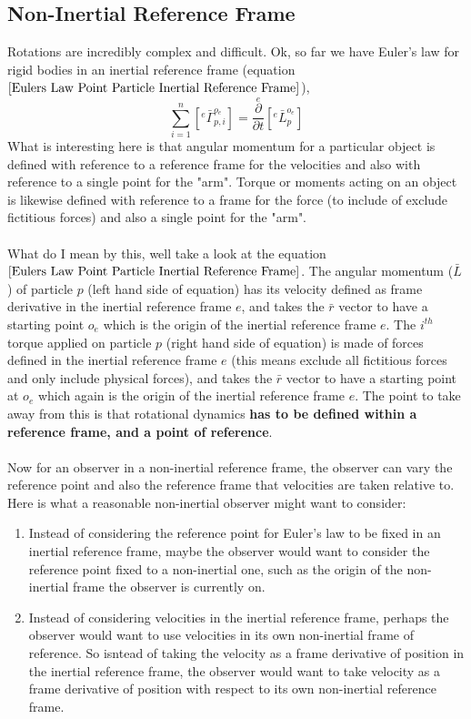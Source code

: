 \subsection{Non-Inertial Reference Frame}
\label{Eulers law point particle non-inertial reference frame}
\begin{comment}
\end{comment}
Rotations are incredibly complex and difficult.
Ok, so far we have Euler's law for rigid bodies in an inertial reference frame (equation $\ref{Eulers Law Point Particle Inertial Reference Frame}$),
$$\sum^{n}_{i = 1}\left[{}^{e}\bar{\Gamma}^{o_{e}}_{p,i}\right] = \overset{e}{\frac{\partial}{\partial t}}\left[{}^{e}\bar{L}^{o_{e}}_{p}\right]$$
What is interesting here is that angular momentum for a particular object is defined with reference to a reference frame for the velocities and also with reference to a single point for the "arm".
Torque or moments acting on an object is likewise defined with reference to a frame for the force (to include of exclude fictitious forces) and also a single point for the "arm".
\\~\\What do I mean by this, well take a look at the equation $\ref{Eulers Law Point Particle Inertial Reference Frame}$. 
The angular momentum ($\bar{L}$) of particle $p$ (left hand side of equation) has its velocity defined as frame derivative in the inertial reference frame $e$, and takes the $\bar{r}$ vector to have a starting point $o_{e}$ which is the origin of the inertial reference frame $e$.
The $i^{th}$ torque applied on particle $p$ (right hand side of equation) is made of forces defined in the inertial reference frame $e$ (this means exclude all fictitious forces and only include physical forces), and takes the $\bar{r}$ vector to have a starting point at $o_{e}$ which again is the origin of the inertial reference frame $e$.
The point to take away from this is that rotational dynamics \textbf{has to be defined within a reference frame, and a point of reference}.
\\~\\Now for an observer in a non-inertial reference frame, the observer can vary the reference point and also the reference frame that velocities are taken relative to.
Here is what a reasonable non-inertial observer might want to consider:
\begin{enumerate}
    \item Instead of considering the reference point for Euler's law to be fixed in an inertial reference frame, maybe the observer would want to consider the reference point fixed to a non-inertial one, such as the origin of the non-inertial frame the observer is currently on.
    \item Instead of considering velocities in the inertial reference frame, perhaps the observer would want to use velocities in its own non-inertial frame of reference.
    So isntead of taking the velocity as a frame derivative of position in the inertial reference frame, the observer would want to take velocity as a frame derivative of position with respect to its own non-inertial reference frame.
\end{enumerate}
